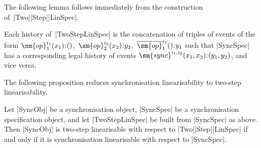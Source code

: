 
The following lemma follows immediately from the construction
of~|Two|\-|Step|\-|LinSpec|. 
%
\begin{lemma}
\label{lem:TwoStepLinSpec-histories}
Each history of~|TwoStepLinSpec| is the concatenation of triples of events of
the form $\sm{op}_1^{i_1}(x_1) \:: ()$,\, $\sm{op}_2^{i_2}(x_2) \:: y_2$,\,
$\overline{\sm{op}}_1^{i_1}() \:: y_1$  such that |SyncSpec| has a
corresponding legal history of events $\sm{sync}^{i_1,i_2}(x_1,x_2) \::
(y_1,y_2)$, and vice versa.
\end{lemma}


The following proposition reduces synchronisation linearisability to two-step
linearisability.
%
\begin{prop}
Let |SyncObj| be a synchronisation object, |SyncSpec| be a synchronisation
specification object, and let |TwoStepLinSpec| be built from |SyncSpec| as
above.  Then |SyncObj| is two-step linearisable with respect to
|Two|\-|Step|\-|LinSpec| if and only if it is synchronisation linearisable
with respect to |SyncSpec|.
\end{prop}
